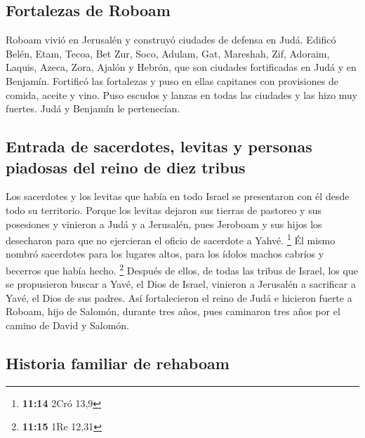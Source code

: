 \begin{paracol}{2}
\hypertarget{fortalezas-de-roboam}{%
\subsection{Fortalezas de Roboam}\label{fortalezas-de-roboam}}

 Roboam vivió en Jerusalén y construyó ciudades de defensa
en Judá.  Edificó Belén, Etam, Tecoa,  Bet
Zur, Soco, Adulam,  Gat, Mareshah, Zif, 
Adoraim, Laquis, Azeca,  Zora, Ajalón y Hebrón, que son
ciudades fortificadas en Judá y en Benjamín.  Fortificó
las fortalezas y puso en ellas capitanes con provisiones de comida,
aceite y vino.  Puso escudos y lanzas en todas las
ciudades y las hizo muy fuertes. Judá y Benjamín le pertenecían.

\hypertarget{entrada-de-sacerdotes-levitas-y-personas-piadosas-del-reino-de-diez-tribus}{%
\subsection{Entrada de sacerdotes, levitas y personas piadosas del reino
de diez
tribus}\label{entrada-de-sacerdotes-levitas-y-personas-piadosas-del-reino-de-diez-tribus}}

 Los sacerdotes y los levitas que había en todo Israel se
presentaron con él desde todo su territorio.  Porque los
levitas dejaron sus tierras de pastoreo y sus posesiones y vinieron a
Judá y a Jerusalén, pues Jeroboam y sus hijos los desecharon para que no
ejercieran el oficio de sacerdote a Yahvé. \footnote{\textbf{11:14} 2Cró
  13,9}  Él mismo nombró sacerdotes para los lugares
altos, para los ídolos machos cabríos y becerros que había hecho.
\footnote{\textbf{11:15} 1Re 12,31}  Después de ellos, de
todas las tribus de Israel, los que se propusieron buscar a Yavé, el
Dios de Israel, vinieron a Jerusalén a sacrificar a Yavé, el Dios de sus
padres.  Así fortalecieron el reino de Judá e hicieron
fuerte a Roboam, hijo de Salomón, durante tres años, pues caminaron tres
años por el camino de David y Salomón.

\hypertarget{historia-familiar-de-rehaboam}{%
\subsection{Historia familiar de
rehaboam}\label{historia-familiar-de-rehaboam}}


\end{paracol}
